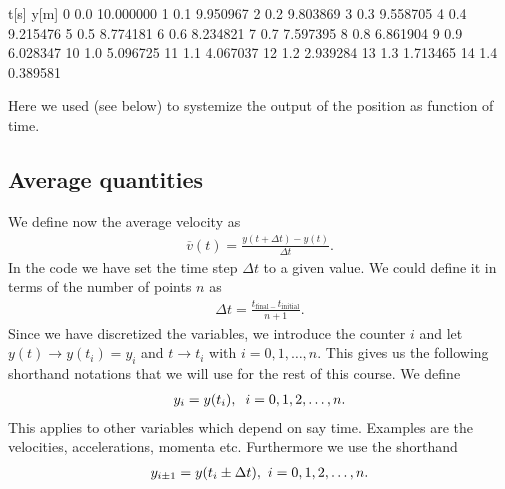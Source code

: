 \documentclass[letterpaper,10pt,english]{sphinxmanual}
\begin{document}
\begin{sphinxVerbatim}[commandchars=\\\{\}]
    t[s]       y[m]
0    0.0  10.000000
1    0.1   9.950967
2    0.2   9.803869
3    0.3   9.558705
4    0.4   9.215476
5    0.5   8.774181
6    0.6   8.234821
7    0.7   7.597395
8    0.8   6.861904
9    0.9   6.028347
10   1.0   5.096725
11   1.1   4.067037
12   1.2   2.939284
13   1.3   1.713465
14   1.4   0.389581
\end{sphinxVerbatim}

\noindent{}

Here we used  (see below) to systemize the output of the position as function of time.


\subsection{Average quantities}
\label{\detokenize{chapter2:average-quantities}}
We define now the average velocity as
\begin{equation*}
\begin{split}
\overline{v}(t) = \frac{y(t+\Delta t)-y(t)}{\Delta t}.
\end{split}
\end{equation*}
In the code we have set the time step \(\Delta t\) to a given value. We could define it in terms of the number of points \(n\) as
\begin{equation*}
\begin{split}
\Delta t = \frac{t_{\mathrm{final}-}t_{\mathrm{initial}}}{n+1}.
\end{split}
\end{equation*}
Since we have discretized the variables, we introduce the counter \(i\) and let \(y(t)\rightarrow y(t_i)=y_i\) and \(t\rightarrow t_i\)
with \(i=0,1,\dots, n\). This gives us the following shorthand notations that we will use for the rest of this course. We define
\begin{equation*}
\begin{split}
y_i = y(t_i),\hspace{0.2cm} i=0,1,2,\dots,n.
\end{split}
\end{equation*}
This applies to other variables which depend on say time. Examples are the velocities, accelerations, momenta etc.
Furthermore we use the shorthand
\begin{equation*}
\begin{split}
y_{i\pm 1} = y(t_i\pm \Delta t),\hspace{0.12cm} i=0,1,2,\dots,n.
\end{split}
\end{equation*}
\end{document}
